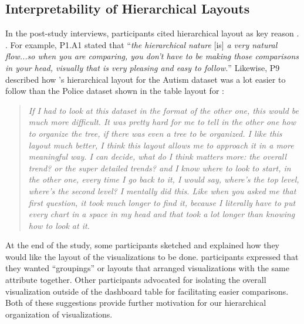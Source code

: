 \subsection{Interpretability of Hierarchical Layouts}
\par In the post-study interviews, participants cited hierarchical layout as  key reason . . For example, P1.A1 stated that ``\textit{the hierarchical nature} [is] \textit{a very natural flow...so when you are comparing, you don't have to be making those comparisons in your head, visually that is very pleasing and easy to follow.}'' %
Likewise, P9 described how \system's hierarchical layout for the Autism dataset was a lot easier to follow than the Police dataset shown in the table layout for \cluster:
\begin{quote}
\textit{If I had to look at this dataset in the format of the other one, this would be much more difficult. It was pretty hard for me to tell in the other one how to organize the tree, if there was even a tree to be organized. I like this layout much better, I think this layout allows me to approach it in a more meaningful way. I can decide, what do I think matters more: the overall trend? or the super detailed trends? and I know where to look to start, in the other one, every time I go back to it, I would say, where's the top level, where's the second level? I mentally did this. Like when you asked me that first question, it took much longer to find it, because I literally have to put every chart in a space in my head and that took a lot longer than knowing how to look at it.}
\end{quote}
At the end of the study, some participants  sketched and explained how they would like the layout of the visualizations to be done.  participants expressed that they wanted ``groupings'' or layouts that arranged visualizations with the same attribute together. Other participants advocated for isolating the overall visualization outside of the dashboard table for facilitating easier comparisons. Both of these suggestions provide further motivation for our hierarchical organization of visualizations. 
